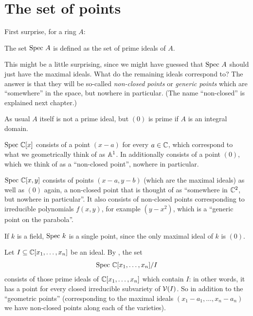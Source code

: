 \section{The set of points}

First surprise, for a ring $A$:
\begin{definition}
	The set $\text{Spec } A$ is defined as the set of prime ideals of $A$.
\end{definition}

This might be a little surprising, since we might have guessed
that $\text{Spec } A$ should just have the maximal ideals.
What do the remaining ideals correspond to?
The answer is that they will be so-called \emph{non-closed points}
or \emph{generic points} which are ``somewhere'' in the space,
but nowhere in particular.
(The name ``non-closed'' is explained next chapter.)

\begin{remark}
	As usual $A$ itself is not a prime ideal, but $(0)$
	is prime if $A$ is an integral domain.
\end{remark}

\begin{example}
	\listhack
	\begin{enumerate}[(a)]
		\ii $\text{Spec } \mathbb C[x]$ consists of a point $(x-a)$ for every $a \in \mathbb C$,
		which correspond to what we geometrically think of as $\mathbb A^1$.
		In additionally consists of a point $(0)$,
		which we think of as a ``non-closed point'', nowhere in particular.

		\ii $\text{Spec } \mathbb C[x,y]$ consists of points $(x-a,y-b)$
		(which are the maximal ideals) as well as $(0)$ again,
		a non-closed point that is thought of as ``somewhere in $\mathbb C^2$,
		but nowhere in particular''.
		It also consists of non-closed points corresponding to irreducible
		polynomials $f(x,y)$, for example $(y-x^2)$,
		which is a ``generic point on the parabola''.

		\ii If $k$ is a field, $\text{Spec } k$ is a single point,
		since the only maximal ideal of $k$ is $(0)$.
	\end{enumerate}
\end{example}

\begin{example}
	Let $I \subseteq \mathbb C[x_1, \dots, x_n]$ be an ideal.
	By ,
	the set \[ \text{Spec } \mathbb C[x_1, \dots, x_n] /I \]
	consists of those prime ideals of $\mathbb C[x_1, \dots, x_n]$
	which contain $I$: in other words, it has a
	point for every closed irreducible subvariety of $\mathcal V(I)$.
	So in addition to the ``geometric points'' 
	(corresponding to the maximal ideals $(x_1-a_1, \dots, x_n-a_n)$
	we have non-closed points along each of the varieties).
\end{example}

